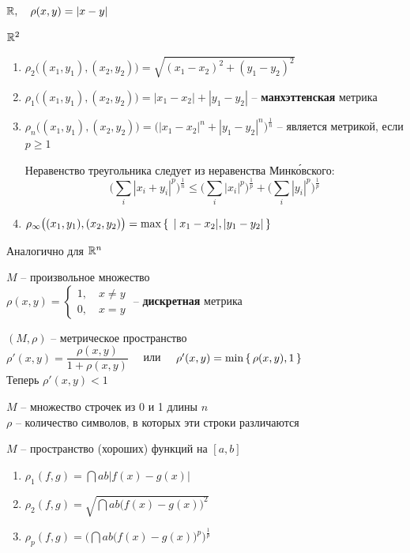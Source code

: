 \begin{exmpls}
	\item $ \mathbb{R}, \quad \rho(x, y) = |x - y| $
	\item $ \mathbb{R}^2 $
	\begin{enumerate}
		\item $ \rho_2 \big( (x_1, y_1), (x_2, y_2) \big) = \sqrt{(x_1 - x_2)^2 + (y_1 - y_2)^2} $
		\item $ \rho_1 \big( (x_1, y_1), (x_2, y_2) \big) = |x_1 - x_2| + |y_1 - y_2| $ -- \textbf{манхэттенская} метрика
		\item $ \rho_n \big( (x_1, y_1), (x_2, y_2) \big) = \bigg( |x_1 - x_2|^n + |y_1 - y_2|^n \bigg)^{\frac1n} $ -- является метрикой, если $ p \ge 1 $
		\begin{remark}
			Неравенство треугольника следует из неравенства Минк\'{о}вского:
			$$ \bigg( \sum_i |x_i + y_i|^p \bigg)^{\frac1n} \le \bigg( \sum_i |x_i|^p \bigg)^{\frac1p} + \bigg( \sum_i |y_i|^p \bigg)^{\frac1p} $$
		\end{remark}
		\item $ \rho_\infty \big( (x_1, y_1), (x_2, y_2) \big) = \max\set{|x_1 - x_2|, |y_1 - y_2|} $
	\end{enumerate}
	\item Аналогично для $ \mathbb{R}^n $
	\item $ M $ -- произвольное множество \\
	$ \rho(x, y) =
	\begin{cases}
		1, \quad x \ne y \\
		0, \quad x = y
	\end{cases} $ -- \textbf{дискретная} метрика
	\item $ (M, \rho) $ -- метрическое пространство \\
	$ \rho'(x, y) = \dfrac{\rho(x, y)}{1 + \rho(x, y)} \quad $ или $ \quad \rho'(x, y) = \min\set{\rho(x, y), 1} $ \\
	Теперь $ \rho'(x, y) < 1 $
	\item $ M $ -- множество строчек из 0 и 1 длины $ n $ \\
	$ \rho $ -- количество символов, в которых эти строки различаются
	\item $ M $ -- пространство (хороших) функций на $ [a, b] $
	\begin{enumerate}
		\item $ \rho_1(f, g) = \dint{a}b{|f(x) - g(x)|} $
		\item $ \rho_2(f, g) = \sqrt{\dint{a}b{ \big( f(x) - g(x) \big)^2}} $
		\item $ \rho_p(f, g) = \bigg( \dint{a}b{ \big( f(x) - g(x) \big)^p} \bigg)^{\frac1p} $

\end{enumerate}
\end{exmpls}
